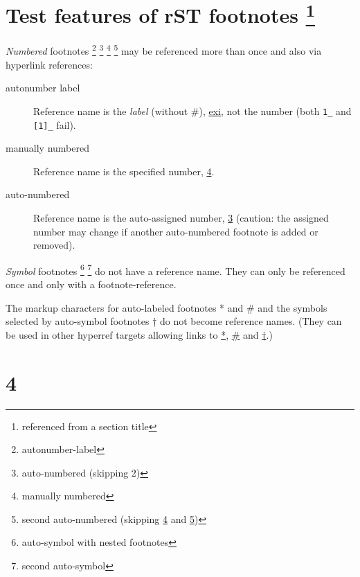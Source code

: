 \documentclass[a4paper]{article}
\begin{document}
\section{Test features of rST footnotes%
 \protect\footnote{\label{top}%
  referenced from a section title
}}

\emph{Numbered} footnotes%
\footnote{\label{exi}%
  autonumber-label
}%
\footnote{\label{footnote-2}%
  auto-numbered (skipping 2)
}%
\footnote{\label{footnote-1}%
  manually numbered
}%
\footnote{%
  second auto-numbered (skipping \hyperref[footnote-1]{4} and \hyperref[section-2]{5})
} may be referenced more than
once and also via hyperlink references:

\begin{description}
\item[{autonumber label}] 
Reference name is the \emph{label} (without \#),
\hyperref[exi]{exi}, not the number (both \texttt{1\_} and \texttt{{[}1{]}\_} fail).

\item[{manually numbered}] 
Reference name is the specified number, \hyperref[footnote-1]{4}.

\item[{auto-numbered}] 
Reference name is the auto-assigned number, \hyperref[footnote-2]{3}
(caution: the assigned number may change if another
auto-numbered footnote is added or removed).
\end{description}

\emph{Symbol} footnotes%
\footnote{%
  auto-symbol with nested footnotes
}%
%
%
\footnote{%
  second auto-symbol
} do not have a reference name.
They can only be referenced once and only with a footnote-reference.

The markup characters for auto-labeled footnotes \textquotedbl{}%
\label{target-1}*\textquotedbl{} and \textquotedbl{}%
\label{target-2}\#\textquotedbl{} and
the symbols selected by auto-symbol footnotes \textquotedbl{}%
\label{target-3}†\textquotedbl{} do not become
reference names. (They can be used in other hyperref targets allowing
links to \hyperref[target-1]{*}, \hyperref[target-2]{\#} and \hyperref[target-3]{†}.)


\section{4}
\end{document}
